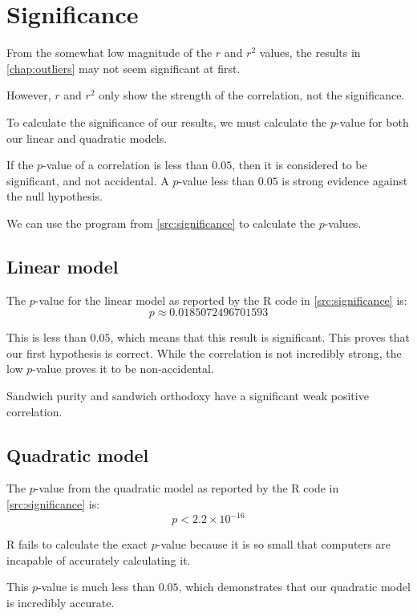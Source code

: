 \chapter{Significance}\label{chap:significance}

From the somewhat low magnitude of the $r$ and $r^2$ values, the results in \vref{chap:outliers} may not seem significant at first.

However, $r$ and $r^2$ only show the strength of the correlation, not the significance.

To calculate the significance of our results, we must calculate the $p$-value for both our linear and quadratic models.\cite{pVals}

If the $p$-value of a correlation is less than $0.05$, then it is considered to be significant, and not accidental.
A $p$-value less than $0.05$ is strong evidence against the null hypothesis.\cite{pVals}

We can use the program from \vref{src:significance} to calculate the $p$-values.

\section{Linear model}
The $p$-value for the linear model as reported by the R code in \vref{src:significance} is:
\[p \approx \num{0.0185072496701593}\]

This is less than $0.05$, which means that this result is significant.
This proves that our first hypothesis is correct.
While the correlation is not incredibly strong, the low $p$-value proves it to be non-accidental.

Sandwich purity and sandwich orthodoxy have a significant weak positive correlation.

\section{Quadratic model}
The $p$-value from the quadratic model as reported by the R code in \vref{src:significance} is:
\[p < 2.2 \times 10 ^ {-16}\]

R fails to calculate the exact $p$-value because it is so small that computers are incapable of accurately calculating it.

This $p$-value is much less than $0.05$, which demonstrates that our quadratic model is incredibly accurate.
